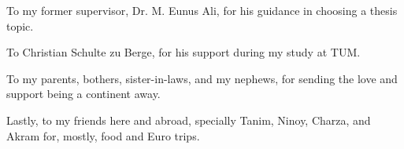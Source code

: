 \vspace{2mm} To my former supervisor, Dr. M. Eunus Ali, for his guidance in choosing a thesis topic.

\vspace{2mm} To Christian Schulte zu Berge, for his support during my study at TUM.

\vspace{2mm} To my parents, bothers, sister-in-laws, and my nephews, for sending the love and support being a continent away.

\vspace{2mm} Lastly, to my friends here and abroad, specially Tanim, Ninoy, Charza, and Akram for, mostly, food and Euro trips.

